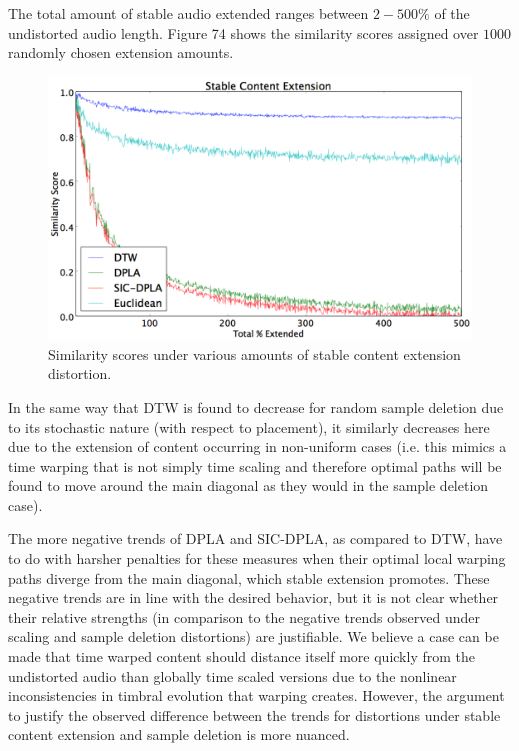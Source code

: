 \documentclass[12pt]{report} 	%
\numberwithin{figure}{chapter}
\numberwithin{table}{chapter}
\numberwithin{equation}{chapter}
\begin{document}
\begin{flushleft}
The total amount of stable audio extended ranges between $2-500\%$ of the undistorted audio length. Figure 74 shows the similarity scores assigned over $1000$ randomly chosen extension amounts.
\vspace{12pt}
\begin{figure}[h!]
\begin{center}
\includegraphics[scale=0.5,width=\linewidth]{StableExtension}
\caption[Extension of stable timbral content results]{Similarity scores under various amounts of stable content extension distortion.}
\end{center}
\end{figure}
In the same way that DTW is found to decrease for random sample deletion due to its stochastic nature (with respect to placement), it similarly decreases here due to the extension of content occurring in non-uniform cases (i.e. this mimics a time warping that is not simply time scaling and therefore optimal paths will be found to move around the main diagonal as they would in the sample deletion case). 

The more negative trends of DPLA and SIC-DPLA, as compared to DTW, have to do with harsher penalties for these measures when their optimal local warping paths diverge from the main diagonal, which stable extension promotes. These negative trends are in line with the desired behavior, but it is not clear whether their relative strengths (in comparison to the negative trends observed under scaling and sample deletion distortions) are justifiable. We believe a case can be made that time warped content should distance itself more quickly from the undistorted audio than globally time scaled versions due to the nonlinear inconsistencies in timbral evolution that warping creates. However, the argument to justify the observed difference between the trends for distortions under stable content extension and sample deletion is more nuanced.


\end{flushleft}
\end{document}
